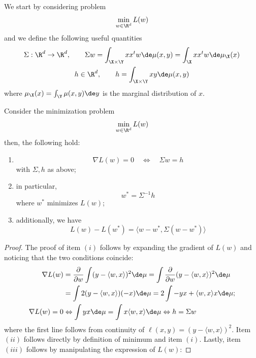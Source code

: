We start by considering problem
\[
\min_{w\in\R^d} L(w)
\]
and we define the following useful quantities
\begin{gather*}
    \Sigma:\R^d\to\R^d, \qquad \Sigma w = \int_{\X\times\Y} xx^tw \de \mu(x,y) = \int_{\X} xx^tw \de \mu_\X(x)\\
    h\in\R^d, \qquad h= \int_{\X\times\Y} xy\de\mu(x,y)
    \end{gather*}
        where $\mu_\X (x) = \int_{\Y} \mu(x,y) \de y$ is the marginal distribution of $x$. 
\begin{proposition}\label{prop: infinite,noreg}
Consider the minimization problem 
\[
\min_{w\in\R^d} L(w)
\]
then, the following hold:
    \begin{enumerate}[label=(\roman*)]
        \item \[\nabla L(w)=0 \quad\Longleftrightarrow\quad \Sigma w = h\]
        with $\Sigma, h$ as above;
        \item in particular, \[w^* = \Sigma^{-1}h\]
        where $w^*$ minimizes $L(w)$;
        \item additionally, we have
        \[L(w) - L(w^*) = \langle w-w^*, \Sigma(w-w^*)\rangle\]
    \end{enumerate}
    \begin{proof}
        The proof of item $(i)$ follows by expanding the gradient of $L(w)$ and noticing that the two conditions coincide:
        \begin{align*}
            \nabla L(w)& =\frac{\partial}{\partial w} \int (y-\langle w,x \rangle)^2 \de\mu = \int \frac{\partial}{\partial w} (y-\langle w,x \rangle)^2 \de\mu \\
            & = \int 2 (y-\langle w,x \rangle) (-x) \de \mu = 2 \int - yx + \langle w,x \rangle x \de\mu;\\
            \nabla L(w)=0&\Leftrightarrow \int yx \de \mu = \int x\langle w,x \rangle \de \mu \Leftrightarrow h = \Sigma w
        \end{align*}
        where the first line follows from continuity of $\ell(x,y)=(y-\langle w,x \rangle)^2$. Item $(ii)$ follows directly by definition of minimum and item $(i)$. 
        Lastly, item $(iii)$ follows by manipulating the expression of $L(w)$:


\end{proof}
\end{proposition}
